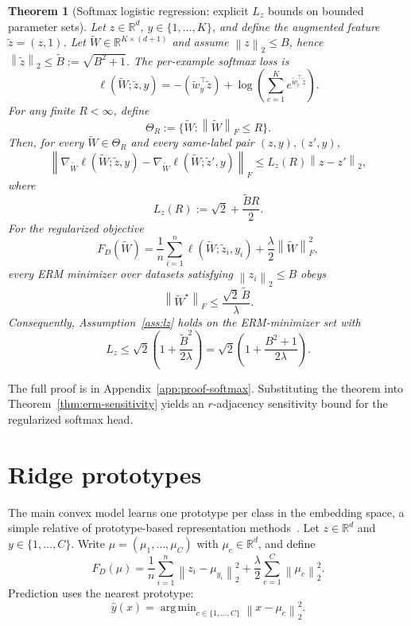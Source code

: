 \documentclass[11pt,a4paper]{report}
\theoremstyle{plain}
\newtheorem{theorem}{Theorem}[chapter]
\theoremstyle{definition}
\theoremstyle{remark}
\DeclareMathOperator*{\argmin}{arg\,min}
\newcommand{\R}{\mathbb{R}}
\newcommand{\norm}[1]{\left\lVert #1\right\rVert}
\begin{document}
\begin{theorem}[Softmax logistic regression: explicit $L_z$ bounds on bounded parameter sets]
\label{thm:softmax-lz}
Let $z\in\R^d$, $y\in\{1,\ldots,K\}$, and define the augmented feature $\widetilde z=(z,1)$.  Let $\widetilde W\in\R^{K\times(d+1)}$ and assume $\norm{z}_2\le B$, hence $\norm{\widetilde z}_2\le\widetilde B:=\sqrt{B^2+1}$.  The per-example softmax loss is
\[
\ell(\widetilde W;\widetilde z,y)
=
-(\widetilde w_y^\top\widetilde z)
+
\log\left(\sum_{c=1}^K e^{\widetilde w_c^\top\widetilde z}\right).
\]
For any finite $R<\infty$, define
\[
\Theta_R:=\{\widetilde W:\norm{\widetilde W}_F\le R\}.
\]
Then, for every $\widetilde W\in\Theta_R$ and every same-label pair $(z,y),(z',y)$,
\[
\norm{\nabla_{\widetilde W}\ell(\widetilde W;\widetilde z,y)-\nabla_{\widetilde W}\ell(\widetilde W;\widetilde z',y)}_F
\le
L_z(R)\norm{z-z'}_2,
\]
where
\[
L_z(R):=\sqrt2+\frac{\widetilde B R}{2}.
\]
For the regularized objective
\[
F_D(\widetilde W)=\frac1n\sum_{i=1}^n\ell(\widetilde W;\widetilde z_i,y_i)+\frac\lambda2\norm{\widetilde W}_F^2,
\]
every ERM minimizer over datasets satisfying $\norm{z_i}_2\le B$ obeys
\[
\norm{\widetilde W^\star}_F\le \frac{\sqrt2\,\widetilde B}{\lambda}.
\]
Consequently, Assumption~\ref{ass:lz} holds on the ERM-minimizer set with
\[
L_z
\le
\sqrt2\left(1+\frac{\widetilde B^2}{2\lambda}\right)
=
\sqrt2\left(1+\frac{B^2+1}{2\lambda}\right).
\]
\end{theorem}

The full proof is in Appendix~\ref{app:proof-softmax}.  Substituting the theorem into Theorem~\ref{thm:erm-sensitivity} yields an $r$-adjacency sensitivity bound for the regularized softmax head.

\section{Ridge prototypes}
\label{sec:ridge-prototypes}

The main convex model learns one prototype per class in the embedding space, a simple relative of prototype-based representation methods~\cite{snell2017prototypical,wahdany2025dppl}.  Let $z\in\R^d$ and $y\in\{1,\ldots,C\}$.  Write $\mu=(\mu_1,\ldots,\mu_C)$ with $\mu_c\in\R^d$, and define
\begin{equation}
\label{eq:ridge-proto-objective}
F_D(\mu)
=
\frac1n\sum_{i=1}^n\norm{z_i-\mu_{y_i}}_2^2
+
\frac\lambda2\sum_{c=1}^C\norm{\mu_c}_2^2.
\end{equation}
Prediction uses the nearest prototype:
\[
\widehat y(x)=\argmin_{c\in\{1,\ldots,C\}}\norm{x-\mu_c}_2^2.
\]
\end{document}
